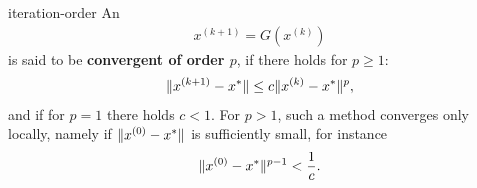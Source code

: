 \begin{Definition}{iteration-order}
  An 
  \begin{gather*}
    x^{(k+1)} = G\left(x^{(k)}\right)
  \end{gather*}
  is said to be \textbf{convergent of order $p$}, if there holds for
  $p\ge 1$:
  \begin{gather*}
    \lVert x^{(k+1)}-x^*\rVert \le c \lVert x^{(k)}-x^*\rVert^p,
  \end{gather*}
  and if for $p=1$ there holds $c<1$. For $p>1$, such a method
  converges only locally, namely if $\lVert x^{(0)}-x^*\rVert$ is
  sufficiently small, for instance
  \begin{gather*}
    \lVert x^{(0)}-x^*\rVert^{p-1} < \frac1c.
  \end{gather*}
\end{Definition}
